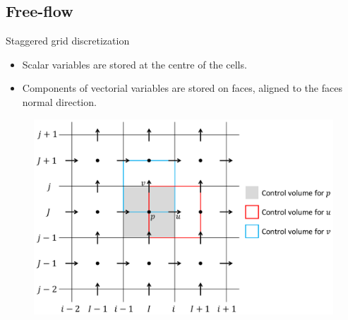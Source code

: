 \documentclass{beamer}
\begin{document}
\subsection*{Free-flow}
\begin{frame}{Staggered grid discretization}
\begin{itemize}
	\item Scalar variables are stored at the centre of the cells.
	\item Components of vectorial variables are stored on faces, aligned to the 
	faces normal direction.
\end{itemize}
\begin{figure}
	\centering
	\includegraphics[trim={2cm 1cm 0cm 0cm}, clip, 
	height=0.65\textheight]{staggered_grid_mia.pdf}
\end{figure}
\end{frame}
\end{document}
